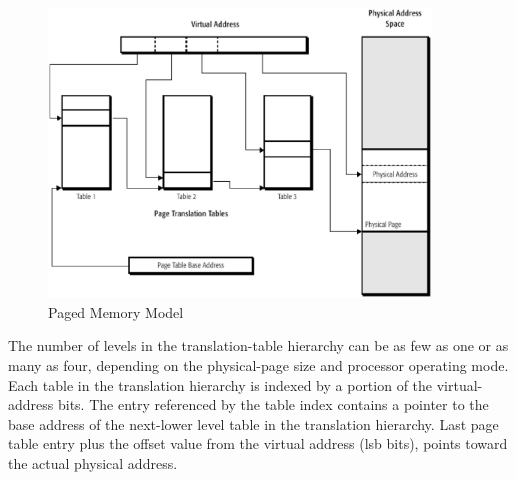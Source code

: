 \begin{figure}[H]
\centering
\includegraphics[width=4in]{./figures/paging.eps}
\caption{Paged Memory Model}
\label{fig:paging.eps}
\end{figure}



The number of levels in the translation-table hierarchy can be as few as one or as many as four, depending on the physical-page size and processor operating mode. Each table in the translation hierarchy is indexed by a portion of the virtual-address bits. The entry referenced by the table index contains a pointer to the base address of the next-lower level table in the translation hierarchy. Last page table entry plus the offset value from the virtual address (lsb bits), points toward the actual physical address.  

